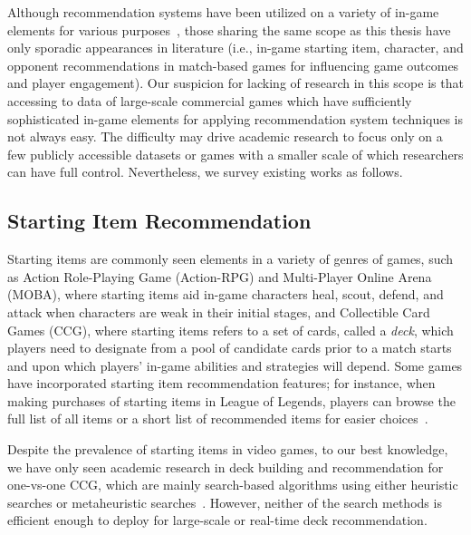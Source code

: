 Although recommendation systems have been utilized on a variety of in-game elements for various purposes~\cite{kolen2018horizontal,wu2017recommendation}, those sharing the same scope as this thesis have only sporadic appearances in literature (i.e., in-game starting item, character, and opponent recommendations in match-based games for influencing game outcomes and player engagement). 
Our suspicion for lacking of research in this scope is that accessing to data of large-scale commercial games which have sufficiently sophisticated in-game elements for applying recommendation system techniques is not always easy. The difficulty may drive academic research to focus only on a few publicly accessible datasets or games with a smaller scale of which researchers can have full control. Nevertheless, we survey existing works as follows.

\subsection{Starting Item Recommendation}
Starting items are commonly seen elements in a variety of genres of games, such as Action Role-Playing Game (Action-RPG) and Multi-Player Online Arena (MOBA), where starting items aid in-game characters heal, scout, defend, and attack when characters are weak in their initial stages, and Collectible Card Games (CCG), where starting items refers to a set of cards, called a \textit{deck}, which players need to designate from a pool of candidate cards prior to a match starts and upon which players' in-game abilities and strategies will depend. Some games have incorporated starting item recommendation features; for instance, when making purchases of starting items in League of Legends, players can browse the full list of all items or a short list of recommended items for easier choices~\cite{lol_recomitem}. 

Despite the prevalence of starting items in video games, to our best knowledge, we have only seen academic research in deck building and recommendation for one-vs-one CCG, which are mainly search-based algorithms using either heuristic searches or metaheuristic searches~\cite{birattari2009tuning}. However, neither of the search methods is efficient enough to deploy for large-scale or real-time deck recommendation. 

